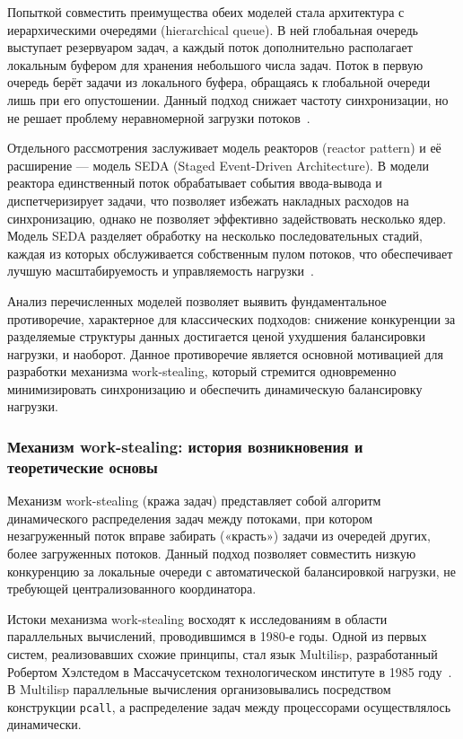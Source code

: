 Попыткой совместить преимущества обеих моделей стала архитектура
с иерархическими очередями (hierarchical queue). В ней глобальная
очередь выступает резервуаром задач, а каждый поток дополнительно
располагает локальным буфером для хранения небольшого числа задач.
Поток в первую очередь берёт задачи из локального буфера, обращаясь
к глобальной очереди лишь при его опустошении. Данный подход снижает
частоту синхронизации, но не решает проблему неравномерной загрузки
потоков~\cite{Williams2019}.

Отдельного рассмотрения заслуживает модель реакторов (reactor pattern)
и её расширение --- модель SEDA (Staged Event-Driven Architecture).
В модели реактора единственный поток обрабатывает события ввода-вывода
и диспетчеризирует задачи, что позволяет избежать накладных расходов
на синхронизацию, однако не позволяет эффективно задействовать
несколько ядер. Модель SEDA разделяет обработку на несколько
последовательных стадий, каждая из которых обслуживается собственным
пулом потоков, что обеспечивает лучшую масштабируемость и
управляемость нагрузки~\cite{Welsh2001}.

Анализ перечисленных моделей позволяет выявить фундаментальное
противоречие, характерное для классических подходов: снижение
конкуренции за разделяемые структуры данных достигается ценой
ухудшения балансировки нагрузки, и наоборот. Данное противоречие
является основной мотивацией для разработки механизма work-stealing,
который стремится одновременно минимизировать синхронизацию и
обеспечить динамическую балансировку нагрузки.

\subsubsection{Механизм work-stealing: история возникновения и теоретические основы}

Механизм work-stealing (кража задач) представляет собой алгоритм
динамического распределения задач между потоками, при котором
незагруженный поток вправе забирать («красть») задачи из очередей
других, более загруженных потоков. Данный подход позволяет совместить
низкую конкуренцию за локальные очереди с автоматической балансировкой
нагрузки, не требующей централизованного координатора.

Истоки механизма work-stealing восходят к исследованиям в области
параллельных вычислений, проводившимся в 1980-е годы. Одной из первых
систем, реализовавших схожие принципы, стал язык Multilisp,
разработанный Робертом Хэлстедом в Массачусетском технологическом
институте в 1985 году~\cite{Halstead1985}. В Multilisp параллельные
вычисления организовывались посредством конструкции \texttt{pcall},
а распределение задач между процессорами осуществлялось динамически.

